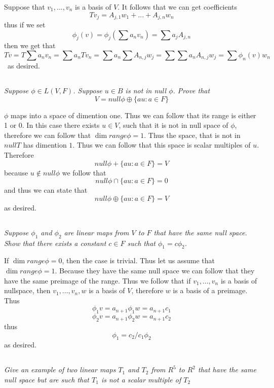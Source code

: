 \documentclass[11pt,oneside,titlepage]{book}
\begin{document}
Suppose that $v_1, ..., v_n$ is a basis of $V$. It follows that we can get coefficients
$$T v_j = A_{j,1} w_1 + ... + A_{j,n} w_n$$
thus if we set
$$\phi_j(v) = \phi_j(\sum a_n v_n) = \sum a_j A_{j, n}$$
then we get that
$$T v = T \sum a_n v_n = \sum a_n T v_n = \sum {a_n \sum A_{n, j} w_j} =
\sum {\sum a_n A_{n, j} w_j} = \sum {\phi_n(v) w_n} $$\
as desired.

\subsection{}

\textit{Suppose $\phi \in L(V, F)$. Suppose $u \in B$ is not in null $\phi$. Prove that}
$$V = null \phi \oplus \{au: a \in F\}$$

$\phi$ maps into a space of dimention one. Thus we can follow that its range is either
1 or 0. In this case there exists $u \in V$, such that it is not in null space of $\phi$,
therefore we can follow that $\dim range \phi = 1$. Thus the space, that is not in $null T$
has dimention $1$. Thus we can follow that this space is scalar multiples of $u$. Therefore
$$null \phi + \{au: a \in F\} = V$$
because $u \notin null \phi$ we follow that 
$$null \phi \cap \{au: a \in F\} = 0$$
and thus we can state that
$$null \phi \oplus \{au: a \in F\} = V$$
as desired.

\subsection{}

\textit{Suppose $\phi_1$ and $\phi_2$ are linear maps from $V$ to $F$ that have the same
  null space. Show that there exists a constant $c \in F$ such that $\phi_1 = c \phi_2$.}

If $\dim range \phi = 0$, then the case is trivial. Thus let us assume that $\dim range \phi = 1$.
Because they have the same null space we can follow that they have the same preimage of
the range. Thus we follow that if $v_1, ..., v_n$ is a basis of nullspace, then
$v_1, ..., v_n, w$ is a basis of $V$, therefore $w$ is a basis of a preimage. Thus
$$\phi_1 v = a_{n + 1}  \phi_1 w = a_{n + 1}c_1 $$
$$\phi_2 v = a_{n + 1}  \phi_2 w = a_{n + 1}c_2 $$
thus
$$\phi_1 = c_2 / c_1 \phi_2$$
as desired.

\subsection{}

\textit{Give an example of two linear maps $T_1$ and $T_2$ from $R^5$ to $R^2$ that have the same
  null space but are such that $T_1$ is not a scalar multiple of $T_2$}
\end{document}
